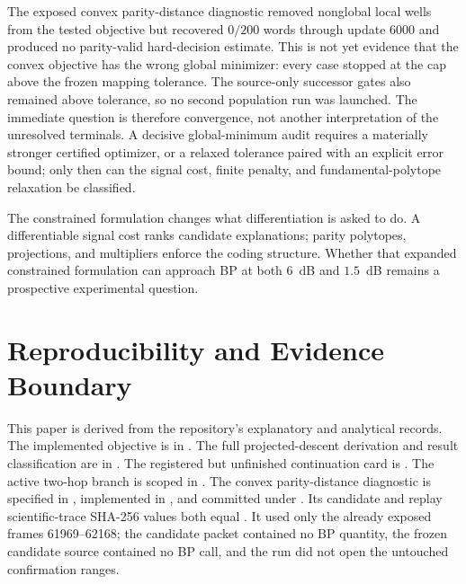 \documentclass[11pt]{article}
\theoremstyle{remark}
\begin{document}
The exposed convex parity-distance diagnostic removed nonglobal local wells
from the tested objective but recovered $0/200$ words through update 6000 and
produced no parity-valid hard-decision estimate.  This is not yet evidence
that the convex objective has the wrong global minimizer: every case stopped
at the cap above the frozen mapping tolerance.  The source-only successor
gates also remained above tolerance, so no second population run was launched.
The immediate question is therefore convergence, not another interpretation
of the unresolved terminals.  A decisive global-minimum audit requires a
materially stronger certified optimizer, or a relaxed tolerance paired with
an explicit error bound; only then can the signal cost, finite penalty, and
fundamental-polytope relaxation be classified.

The constrained formulation changes what differentiation is asked to do.  A
differentiable signal cost ranks candidate explanations; parity polytopes,
projections, and multipliers enforce the coding structure.  Whether that
expanded constrained formulation can approach BP at both $6$~dB and
$1.5$~dB remains a prospective experimental question.

\section*{Reproducibility and Evidence Boundary}

This paper is derived from the repository's explanatory and analytical
records.  The implemented objective is in
.
The full projected-descent derivation and result classification are in
.  The registered but
unfinished continuation card is
.  The active
two-hop branch is scoped in .  The convex
parity-distance diagnostic is specified in
, implemented in
, and committed under
.  Its
candidate and replay scientific-trace SHA-256 values both equal
.
It used only the already exposed frames 61969--62168; the candidate packet
contained no BP quantity, the frozen candidate source contained no BP call,
and the run did not open the untouched confirmation ranges.

\clearpage
\printbibliography
\end{document}

